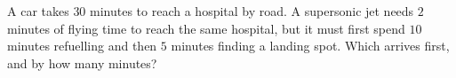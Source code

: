 A car takes $30$ minutes to reach a hospital by road. A supersonic jet needs $2$ minutes of flying time to reach the same hospital, but it must first spend $10$ minutes refuelling and then $5$ minutes finding a landing spot. Which arrives first, and by how many minutes?

